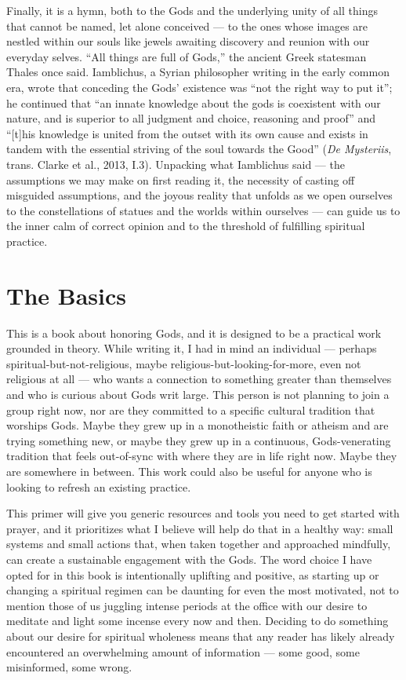 \documentclass[
]{book}
\begin{document}
Finally, it is a hymn, both to the Gods and the underlying unity of all things that cannot be named, let alone conceived --- to the ones whose images are nestled within our souls like jewels awaiting discovery and reunion with our everyday selves. ``All things are full of Gods,'' the ancient Greek statesman Thales once said. Iamblichus, a Syrian philosopher writing in the early common era, wrote that conceding the Gods' existence was ``not the right way to put it''; he continued that ``an innate knowledge about the gods is coexistent with our nature, and is superior to all judgment and choice, reasoning and proof'' and ``{[}t{]}his knowledge is united from the outset with its own cause and exists in tandem with the essential striving of the soul towards the Good'' (\emph{De Mysteriis}, trans. Clarke et al., 2013, I.3). Unpacking what Iamblichus said --- the assumptions we may make on first reading it, the necessity of casting off misguided assumptions, and the joyous reality that unfolds as we open ourselves to the constellations of statues and the worlds within ourselves --- can guide us to the inner calm of correct opinion and to the threshold of fulfilling spiritual practice.

\hypertarget{the-basics}{%
\section{The Basics}\label{the-basics}}

This is a book about honoring Gods, and it is designed to be a practical work grounded in theory. While writing it, I had in mind an individual --- perhaps spiritual-but-not-religious, maybe religious-but-looking-for-more, even not religious at all --- who wants a connection to something greater than themselves and who is curious about Gods writ large. This person is not planning to join a group right now, nor are they committed to a specific cultural tradition that worships Gods. Maybe they grew up in a monotheistic faith or atheism and are trying something new, or maybe they grew up in a continuous, Gods-venerating tradition that feels out-of-sync with where they are in life right now. Maybe they are somewhere in between. This work could also be useful for anyone who is looking to refresh an existing practice.

This primer will give you generic resources and tools you need to get started with prayer, and it prioritizes what I believe will help do that in a healthy way: small systems and small actions that, when taken together and approached mindfully, can create a sustainable engagement with the Gods. The word choice I have opted for in this book is intentionally uplifting and positive, as starting up or changing a spiritual regimen can be daunting for even the most motivated, not to mention those of us juggling intense periods at the office with our desire to meditate and light some incense every now and then. Deciding to do something about our desire for spiritual wholeness means that any reader has likely already encountered an overwhelming amount of information --- some good, some misinformed, some wrong.
\end{document}
